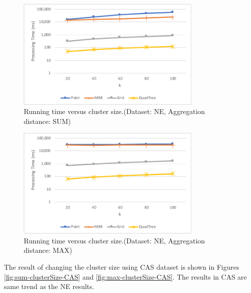 \documentclass[a4paper,11pt]{report}
\theoremstyle{mytheoremstyle}
\begin{document}
\begin{figure}
    \begin{center}
        \includegraphics[width=0.8\textwidth]{src/images/NE-SUM-K.pdf}
    \end{center}
    \caption{Running time versus cluster size.(Dataset: NE, Aggregation distance: SUM)}
    \label{fig:sum-clusterSize}
\end{figure}

\begin{figure}
    \begin{center}
        \includegraphics[width=0.8\textwidth]{src/images/NE-MAX-K.pdf}
    \end{center}
    \caption{Running time versus cluster size.(Dataset: NE, Aggregation distance: MAX)}
    \label{fig:max-clusterSize}
\end{figure}

The result of changing the cluster size using CAS dataset is shown in Figures \ref{fig:sum-clusterSize-CAS} and \ref{fig:max-clusterSize-CAS}. The results in CAS are same trend as the NE results.
\end{document}
